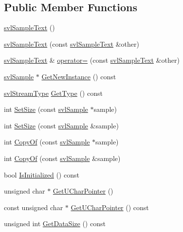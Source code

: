 \subsection*{Public Member Functions}
\begin{DoxyCompactItemize}
\item 
\hyperlink{classsvl_sample_text_abc1ee0d7384c3b5973e672545b077f2c}{svl\+Sample\+Text} ()
\item 
\hyperlink{classsvl_sample_text_ab7f2624a2062ab94637021ac0ff42d9c}{svl\+Sample\+Text} (const \hyperlink{classsvl_sample_text}{svl\+Sample\+Text} \&other)
\item 
\hyperlink{classsvl_sample_text}{svl\+Sample\+Text} \& \hyperlink{classsvl_sample_text_a296f2b77fe78147e349d662d2b855db4}{operator=} (const \hyperlink{classsvl_sample_text}{svl\+Sample\+Text} \&other)
\item 
\hyperlink{classsvl_sample}{svl\+Sample} $\ast$ \hyperlink{classsvl_sample_text_acb744c2cc10b1936226d2cb5fd178634}{Get\+New\+Instance} () const 
\item 
\hyperlink{svl_definitions_8h_aa00696d338a58db361335a01fd11e122}{svl\+Stream\+Type} \hyperlink{classsvl_sample_text_ae52dd26a36d5526a8b697337072819a1}{Get\+Type} () const 
\item 
int \hyperlink{classsvl_sample_text_a0d87196954a68c2aa626cd6c419992bf}{Set\+Size} (const \hyperlink{classsvl_sample}{svl\+Sample} $\ast$sample)
\item 
int \hyperlink{classsvl_sample_text_a5dddeae883c916571cf6bb11fd48f319}{Set\+Size} (const \hyperlink{classsvl_sample}{svl\+Sample} \&sample)
\item 
int \hyperlink{classsvl_sample_text_a3373069f6c1f63f6b77e784d5f4bb2a1}{Copy\+Of} (const \hyperlink{classsvl_sample}{svl\+Sample} $\ast$sample)
\item 
int \hyperlink{classsvl_sample_text_a60362253720628cc31bf5628bc598a5a}{Copy\+Of} (const \hyperlink{classsvl_sample}{svl\+Sample} \&sample)
\item 
bool \hyperlink{classsvl_sample_text_a98f26aa50362d9426dd79129e3688dfa}{Is\+Initialized} () const 
\item 
unsigned char $\ast$ \hyperlink{classsvl_sample_text_aeacf33de1a51401b875ccc839e94b699}{Get\+U\+Char\+Pointer} ()
\item 
const unsigned char $\ast$ \hyperlink{classsvl_sample_text_ad38f2ec4e54e36ddb1043589e8a15296}{Get\+U\+Char\+Pointer} () const 
\item 
unsigned int \hyperlink{classsvl_sample_text_a9077c2511cdb6a27cf428de306a52b5c}{Get\+Data\+Size} () const 

\end{DoxyCompactItemize}

